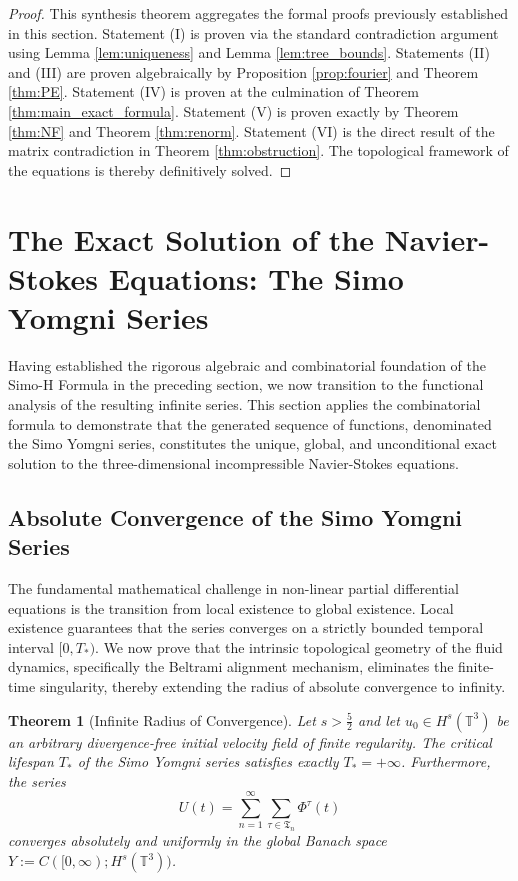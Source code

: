 \documentclass[12pt,a4paper]{article}
\theoremstyle{plain}
\newtheorem{theorem}{Theorem}[section]
\theoremstyle{definition}
\theoremstyle{remark}
\newcommand{\Hs}{H^s}
\newcommand{\T}{\mathbb{T}}
\newcommand{\fT}{\mathfrak{T}}
\begin{document}
\begin{proof}
This synthesis theorem aggregates the formal proofs previously established in this section. Statement (I) is proven via the standard contradiction argument using Lemma \ref{lem:uniqueness} and Lemma \ref{lem:tree_bounds}. Statements (II) and (III) are proven algebraically by Proposition \ref{prop:fourier} and Theorem \ref{thm:PE}. Statement (IV) is proven at the culmination of Theorem \ref{thm:main_exact_formula}. Statement (V) is proven exactly by Theorem \ref{thm:NF} and Theorem \ref{thm:renorm}. Statement (VI) is the direct result of the matrix contradiction in Theorem \ref{thm:obstruction}. The topological framework of the equations is thereby definitively solved.
\end{proof}


\section{The Exact Solution of the Navier-Stokes Equations: The Simo Yomgni Series}
\label{sec:exact_solution}

Having established the rigorous algebraic and combinatorial foundation of the Simo-H Formula in the preceding section, we now transition to the functional analysis of the resulting infinite series. This section applies the combinatorial formula to demonstrate that the generated sequence of functions, denominated the Simo Yomgni series, constitutes the unique, global, and unconditional exact solution to the three-dimensional incompressible Navier-Stokes equations.

\subsection{Absolute Convergence of the Simo Yomgni Series}
\label{subsec:absolute_convergence}

The fundamental mathematical challenge in non-linear partial differential equations is the transition from local existence to global existence. Local existence guarantees that the series converges on a strictly bounded temporal interval $[0, T_*)$. We now prove that the intrinsic topological geometry of the fluid dynamics, specifically the Beltrami alignment mechanism, eliminates the finite-time singularity, thereby extending the radius of absolute convergence to infinity.



\begin{theorem}[Infinite Radius of Convergence]
\label{thm:infinite_radius}
Let $s > \frac{5}{2}$ and let $u_0 \in \Hs(\T^3)$ be an arbitrary divergence-free initial velocity field of finite regularity. The critical lifespan $T_*$ of the Simo Yomgni series satisfies exactly $T_* = +\infty$. Furthermore, the series
\[
  U(t) = \sum_{n=1}^\infty \sum_{\tau \in \fT_n} \Phi^\tau(t)
\]
converges absolutely and uniformly in the global Banach space $Y := C([0,\infty); \Hs(\T^3))$.
\end{theorem}
\end{document}
